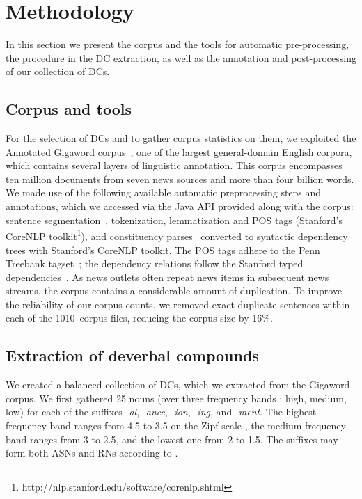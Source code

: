 \documentclass[output=paper]{langsci/langscibook}
\begin{document}
\section{Methodology}\label{sec:methodology}
In this section we present the corpus and the tools for automatic pre-processing, the procedure in the DC extraction, as well as the annotation and post-processing of our collection of DCs.
\subsection{Corpus and tools}
For the selection of DCs and to gather corpus statistics on them, we exploited the Annotated Gigaword corpus~\citep{Napoles:12}, one of the largest general-domain English corpora, which contains several layers of linguistic annotation. This corpus encompasses ten million documents from seven news sources and more than four billion words.                                      
We made use of the following available automatic preprocessing steps and annotations, which we accessed via the Java API provided along with the corpus: sentence segmentation~\citep{Gillick:09}, tokenization, lemmatization and POS tags (Stanford's CoreNLP toolkit\footnote{http://nlp.stanford.edu/software/corenlp.shtml}), and constituency parses~\citep{Huang:10} converted to syntactic dependency trees with Stanford's CoreNLP toolkit.
The POS tags adhere to the Penn Treebank tagset~\citep{Santorini:93}; the dependency relations follow the Stanford typed dependencies~\citep{Marneffe:08}.
As news outlets often repeat news items in subsequent news streams, the corpus contains a considerable amount of duplication. To improve the reliability of our corpus counts,  we removed exact duplicate sentences within each of the 1010~corpus files, reducing the corpus size by 16\%.


\subsection{Extraction of deverbal compounds}\label{sec:extraction:dcs}
We created a balanced collection of DCs, which we extracted from the Gigaword corpus. We first gathered 25 nouns (over three frequency bands : high, medium, low) for each of the suffixes \textit{-al}, \textit{-ance}, \textit{-ion}, \textit{-ing}, and \textit{-ment}. The highest frequency band ranges from 4.5 to 3.5 on the Zipf-scale \citep{VanHeuven:2014}, the medium frequency band ranges from 3 to 2.5, and the lowest one from 2 to 1.5. 
The suffixes may form both ASNs and RNs according to \cite{grimshaw:90}. 
\end{document}
